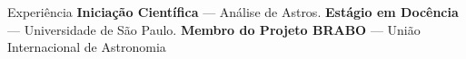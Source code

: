 \begin{rubric}{Experiência}
\entry*[2024 -- 2025]%
	\textbf{Iniciação Científica} — Análise de Astros.
% 
\entry*[2028]%
	\textbf{Estágio em Docência} — Universidade de São Paulo.
% 
\entry*[2029 -- Presente]%
	\textbf{Membro do Projeto BRABO} — União Internacional de Astronomia
% 
\end{rubric}
